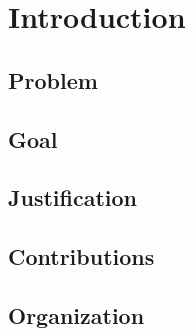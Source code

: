 \chapter{Introduction}
\label{chp:introduction}


\section{Problem}
\lipsum[1-2]\cite{swebok2004}


\section{Goal}
\lipsum[3-4]


\section{Justification}
\lipsum[5-6]


\section{Contributions}
\lipsum[7-8]


\section{Organization}
\lipsum[9-10]
